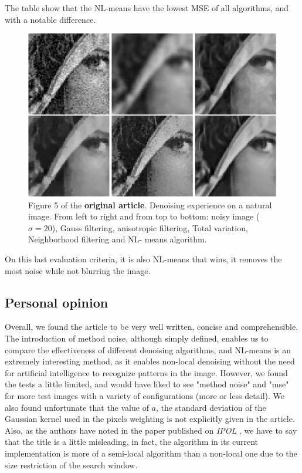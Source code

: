 \documentclass[a4paper, twocolumn, twoside]{article}
\begin{document}
The table show that the NL-means have the lowest MSE of all algorithms, and with a notable difference.\\
\begin{figure}[H]
	\begin{center}
		\includegraphics[width=\columnwidth]{images/visual_quality.png}
	\end{center}
	\caption{Figure 5 of the \textbf{original article}. Denoising experience on a natural image. From left to right and from top to bottom: noisy image ($\sigma = 20$), Gauss filtering, anisotropic filtering, Total variation, Neighborhood filtering and NL- means algorithm.}\label{fig:7273}
\end{figure}
On this last evaluation criteria, it is also NL-means that wins, it removes the most noise while not blurring the image.\\
\subsection{Personal opinion}
Overall, we found the article to be very well written, concise and comprehensible.
The introduction of method noise, although simply defined, enables us to compare the effectiveness of different denoising algorithms,
and NL-means is an extremely interesting method, as it enables non-local denoising without the need
for artificial intelligence to recognize patterns in the image.
However, we found the tests a little limited, and would have liked to see "method noise" and "mse" 
for more test images with a variety of configurations (more or less detail).
We also found unfortunate that the value of $a$, the standard deviation of the Gaussian kernel used in the pixels weighting
is not explicitly given in the article.\\
Also, as the authors have noted in the paper published on \textit{IPOL} \cite{nlmeanscode},
we have to say that the title is a little misleading, in fact,
the algorithm in its current implementation is more of a semi-local
algorithm than a non-local one due to the size restriction of the search window.
\end{document}
